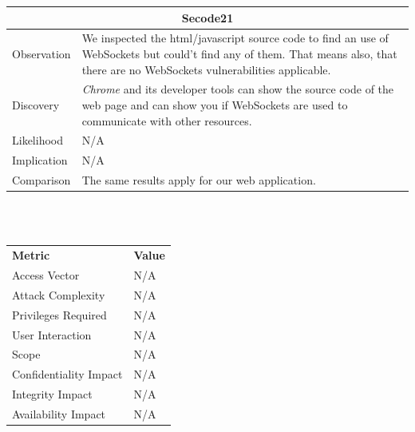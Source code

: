 \documentclass[headsepline,footsepline,footinclude=false,oneside,fontsize=11pt,paper=a4,listof=totoc,bibliography=totoc]{scrbook} %
\begin{document}
\begin{tabular}{ l|p{11cm}  }
	\hline
	\multicolumn{2}{c}{\textbf{Secode21}} \\
	\hline
	Observation   & We inspected the html/javascript source code to find an use of WebSockets but could't find any of them. That means also, that there are no WebSockets vulnerabilities applicable. \\
	Discovery  & \textit{Chrome} and its developer tools can show the source code of the web page and can show you if WebSockets are used to communicate with other resources. \\
	Likelihood & N/A \\
	Implication    & N/A \\
	Comparison & The same results apply for our web application.  \\
	\hline
\end{tabular}
\\
\vspace{0.5cm}
\\
\begin{center}
	\begin{tabular}{ll}
		\rowcolor[HTML]{34CDF9}
		{\color[HTML]{ECF4FF} \textbf{Metric}}        & {\color[HTML]{ECF4FF} \textbf{Value}} \\
		\rowcolor[HTML]{BBDAFF}
		{\color[HTML]{333333} Access Vector}          & {\color[HTML]{333333} } N/A              \\
		\rowcolor[HTML]{ECF4FF}
		{\color[HTML]{333333} Attack Complexity}      & {\color[HTML]{333333} } N/A              \\
		\rowcolor[HTML]{BBDAFF}
		{\color[HTML]{333333} Privileges Required}    & {\color[HTML]{333333} } N/A              \\
		\rowcolor[HTML]{ECF4FF}
		{\color[HTML]{333333} User Interaction}       & {\color[HTML]{333333} } N/A              \\
		\rowcolor[HTML]{BBDAFF}
		{\color[HTML]{333333} Scope}                  & {\color[HTML]{333333} } N/A              \\
		\rowcolor[HTML]{ECF4FF}
		{\color[HTML]{333333} Confidentiality Impact} & {\color[HTML]{333333} } N/A              \\
		\rowcolor[HTML]{BBDAFF}
		{\color[HTML]{333333} Integrity Impact}       & {\color[HTML]{333333} } N/A              \\
		\rowcolor[HTML]{ECF4FF}
		{\color[HTML]{333333} Availability Impact}    & {\color[HTML]{333333} } N/A
	\end{tabular}
\end{center}
\pagebreak
\end{document}
